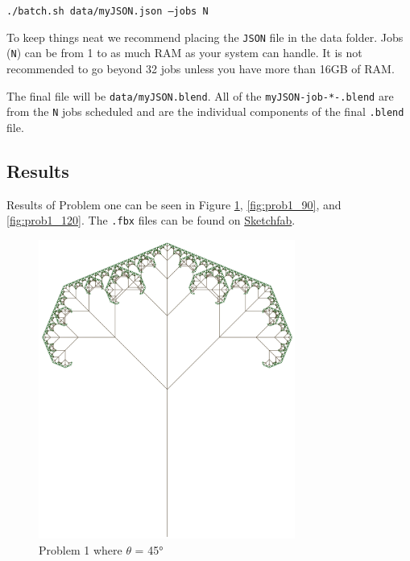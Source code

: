 \texttt{./batch.sh data/myJSON.json --jobs N}

To keep things neat we recommend placing the \texttt{JSON} file in the data
folder. Jobs (\texttt{N}) can be from 1 to as much RAM as your system can
handle. It is not recommended to go beyond 32 jobs unless you have more than
16GB of RAM.

The final file will be \texttt{data/myJSON.blend}. All of the
\texttt{myJSON-job-*-.blend} are from the \texttt{N} jobs scheduled and are the
individual components of the final \texttt{.blend} file.



\subsection{Results}
Results of Problem one can be seen in Figure \ref{fig:prob1_45},
\ref{fig:prob1_90}, and \ref{fig:prob1_120}. The \texttt{.fbx} files can be
found on
\href{https://sketchfab.com/macattackftw/collections/problem-1}{Sketchfab}.

\begin{figure}[H]
    \centering
    \noindent\includegraphics[width=0.75\textwidth]{figures/L-systems/prob1-45}
    \caption{Problem 1 where $\theta$ = 45°}
    \label{fig:prob1_45}
\end{figure}

